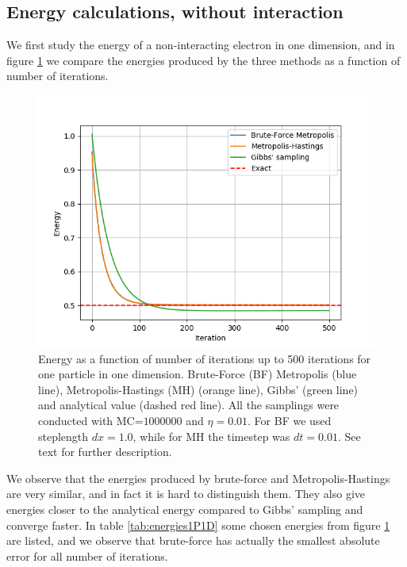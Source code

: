 \documentclass[norsk,a4paper,12pt]{article}
\begin{document}
\subsection{Energy calculations, without interaction}
We first study the energy of a non-interacting electron in one dimension, and in figure \ref{fig:energy1P1D} we compare the energies produced by the three methods as a function of number of iterations. 
 \begin{figure} [H]
 	\centering
 	\includegraphics[scale=0.6]{plots/comparison_1P_MC_1000000_eta_001_iter_500.png}
 	\caption{Energy as a function of number of iterations up to 500 iterations for one particle in one dimension. Brute-Force (BF) Metropolis (blue line), Metropolis-Hastings (MH) (orange line), Gibbs' (green line) and analytical value (dashed red line). All the samplings were conducted with MC=$1000000$ and $\eta=0.01$. For BF we used steplength $dx=1.0$, while for MH the timestep was $dt=0.01$. See text for further description.}
 	\label{fig:energy1P1D}
 \end{figure}
We observe that the energies produced by brute-force and Metropolis-Hastings are very similar, and in fact it is hard to distinguish them. They also give energies closer to the analytical energy compared to Gibbs' sampling and converge faster. In table \ref{tab:energies1P1D} some chosen energies from figure \ref{fig:energy1P1D} are listed, and we observe that brute-force has actually the smallest absolute error for all number of iterations. 
\end{document}
